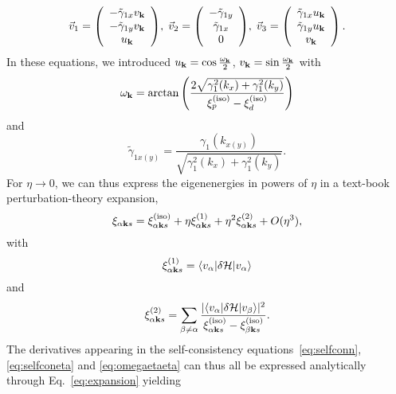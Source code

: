 \documentclass[prb, twocolumn,showpacs,preprintnumbers,amsmath,amssymb, floatfix]{revtex4}
\begin{document}
\begin{equation}
  \vec{v}_{1} = \left(\begin{array}{c}-\tilde{\gamma}_{1x}v_{{\bf k}}\\-\tilde{\gamma}_{1y}v_{{\bf k}}\\u_{{\bf k}} \end{array}\right)\!, \;\vec{v}_{2} = \left(\begin{array}{c}-\tilde{\gamma}_{1y}\\\tilde{\gamma}_{1x}\\0\end{array}\right)\!, \; \vec{v}_{3} = \left(\begin{array}{c}\tilde{\gamma}_{1x}u_{{\bf k}}\\\tilde{\gamma}_{1y}u_{{\bf k}}\\v_{{\bf k}}\end{array}\right). 
  \label{eq:vecs}
\end{equation}
In these equations, we introduced $u_{{\bf k}}=\cos\frac{\omega_{{\bf k}}}2$, $v_{{\bf k}}=\sin\frac{\omega_{{\bf k}}}2$ with
\begin{equation}
  \omega_{{\bf k}} = \arctan\left(\frac{2\sqrt{\gamma_{1}^{2}(k_x) + \gamma_{1}^{2}(k_y)}}{\xi^{({\rm iso})}_{p} - \xi^{({\rm iso})}_{d}}\right)
  \label{eq:appomega}
\end{equation}
and 
\begin{equation}
  \tilde{\gamma}_{1x(y)} = \frac{\gamma_{1}(k_{x(y)})}{\sqrt{\gamma_{1}^2(k_x) + \gamma_{1}^{2}(k_y)}}.
  \label{eq:appgammatilde}
\end{equation}
For $\eta \rightarrow 0$, we can thus express the eigenenergies in powers of $\eta$ in a text-book perturbation-theory expansion,
\begin{equation}
  \xi_{\alpha {\bf k} s} = \xi_{\alpha {\bf k} s}^{({\rm iso})} + \eta \xi_{\alpha {\bf k} s}^{(1)} + \eta^2 \xi_{\alpha {\bf k} s}^{(2)} + O(\eta^3),
  \label{eq:expansion}
\end{equation}
with
\begin{equation}
  \xi_{\alpha {\bf k} s}^{(1)} = \langle v_{\alpha}|\delta\mathcal{H}|v_{\alpha}\rangle
  \label{eq:xi1}
\end{equation}
and 
\begin{equation}
  \xi_{\alpha{\bf k} s}^{(2)} = \sum_{\beta\neq\alpha}\frac{|\langle v_{\alpha}|\delta\mathcal{H}|v_{\beta}\rangle|^2}{\xi_{\alpha {\bf k} s}^{({\rm iso})} - \xi_{\beta{\bf k} s}^{({\rm iso})}}.
  \label{eq:xi2}
\end{equation}
The derivatives appearing in the self-consistency equations~\eqref{eq:selfconn}, \eqref{eq:selfconeta} and \eqref{eq:omegaetaeta} can thus all be expressed analytically through Eq.~\eqref{eq:expansion} yielding
\end{document}
